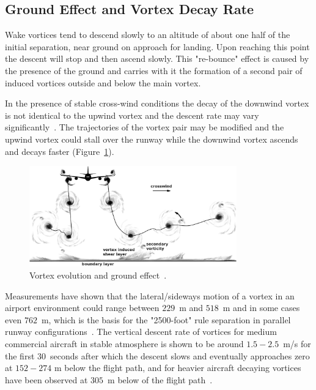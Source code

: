 \subsection{Ground Effect and Vortex Decay Rate}
Wake vortices tend to descend slowly to an altitude of about one half of the initial separation, near ground on approach for landing.
Upon reaching this point the descent will stop and then ascend slowly. This "re-bounce" effect is caused by the presence of the ground and carries with it the formation of a second pair of induced vortices outside and below the main vortex. 

In the presence of stable cross-wind conditions the decay of the downwind vortex is not identical to the upwind vortex and the descent rate may vary significantly~\cite{Hallock2018Apr}. 
The trajectories of the vortex pair may be modified and the upwind vortex could stall over the runway while the downwind vortex ascends and decays faster (Figure~\ref{fig:vortex_ground_effect}).
\begin{figure}[h]
    \centering
    \includegraphics[width=0.8\textwidth]{graphics/Hallock_vortex_evolution.jpg}
    \caption[Wake vortex and ground effect]{Vortex evolution and ground effect~\cite[p.~29]{Hallock2018Apr}.} \label{fig:vortex_ground_effect}
\end{figure}

Measurements have shown that the lateral/sideways motion of a vortex in an airport environment could range between $229$~m and $518$~m and in some cases even $762$~m, which is the basis for the "2500-foot" rule separation in parallel runway configurations~\cite{Hallock2018Apr, hallock2004summary, hallock2003wake}.
The vertical descent rate of vortices for medium commercial aircraft in stable atmosphere is shown to be around $1.5-2.5$~m/s for the first $30$~seconds after which the descent slows and eventually approaches zero at $152-274$ m below the flight path, and for heavier aircraft decaying vortices have been observed at $305$~m below of the flight path~\cite{lissaman1973aircraft, Hallock2018Apr}. 

